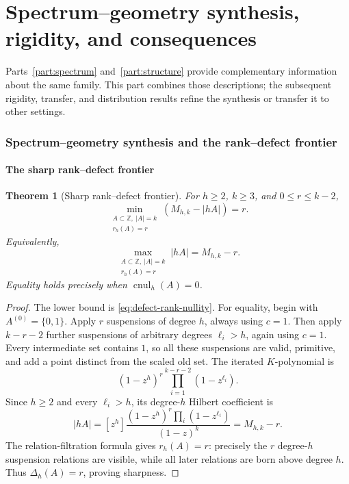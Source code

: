 \documentclass[11pt,reqno]{amsart}
\newtheorem{theorem}{Theorem}[section]
\theoremstyle{definition}
\theoremstyle{remark}
\begin{document}
\part{Spectrum--geometry synthesis, rigidity, and consequences}
\label{part:rigidity}

Parts~\ref{part:spectrum} and~\ref{part:structure} provide complementary
information about the same family.  This part combines those descriptions;
the subsequent rigidity, transfer, and distribution results refine the
synthesis or transfer it to other settings.

\newpage
\section{Spectrum--geometry synthesis and the rank--defect frontier}
\label{sec:collision-synthesis}

\subsection{The sharp rank--defect frontier}

\begin{theorem}[Sharp rank--defect frontier]
\label{thm:rank-defect-frontier}
For $h\geq2$, $k\geq3$, and $0\leq r\leq k-2$,
\begin{equation}\label{eq:rank-defect-frontier}
 \min_{\substack{A\subset\mathbb Z,\ |A|=k\\r_h(A)=r}}
 \left(M_{h,k}-|hA|\right)=r.
\end{equation}
Equivalently,
\[
 \max_{\substack{A\subset\mathbb Z,\ |A|=k\\r_h(A)=r}}
 |hA|=M_{h,k}-r.
\]
Equality holds precisely when $\operatorname{cnul}_h(A)=0$.
\end{theorem}

\begin{proof}
The lower bound is \eqref{eq:defect-rank-nullity}.  For equality, begin with
$A^{(0)}=\{0,1\}$.  Apply $r$ suspensions of degree $h$, always
using $c=1$.  Then apply $k-r-2$ further suspensions of arbitrary degrees
$\ell_i>h$, again using $c=1$.  Every intermediate set contains $1$, so all
these suspensions are valid, primitive, and add a point distinct from the
scaled old set.  The iterated $K$-polynomial is
\[
 (1-z^h)^r\prod_{i=1}^{k-r-2}(1-z^{\ell_i}).
\]
Since $h\geq2$ and every $\ell_i>h$, its degree-$h$ Hilbert coefficient is
\[
 |hA|=[z^h]\frac{(1-z^h)^r
        \prod_i(1-z^{\ell_i})}{(1-z)^k}
      =M_{h,k}-r.
\]
The relation-filtration formula gives $r_h(A)=r$: precisely the $r$
degree-$h$ suspension relations are visible, while all later relations are
born above degree $h$.  Thus $\Delta_h(A)=r$, proving sharpness.
\end{proof}
\end{document}
